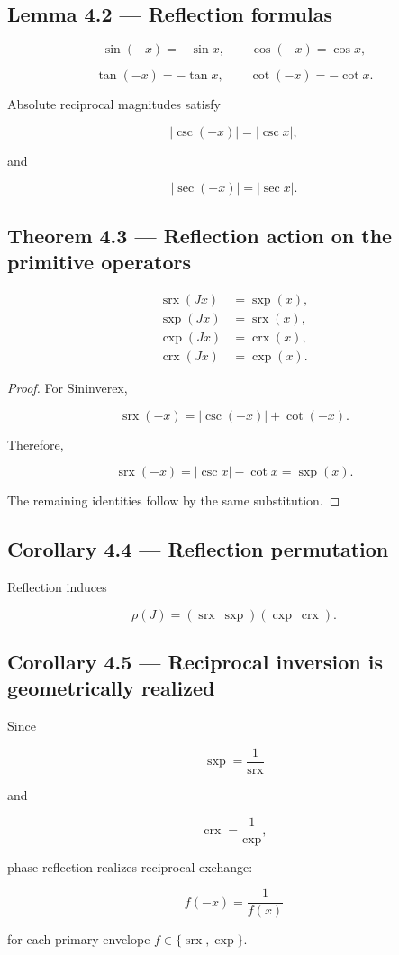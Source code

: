 \documentclass[11pt,oneside,openany]{book}
\newcommand{\PCsubsection}[1]{%
  \subsection*{#1}%
}
\begin{document}
\PCsubsection{Lemma 4.2 --- Reflection formulas}

\[
\sin(-x)=-\sin x, \qquad \cos(-x)=\cos x,
\]

\[
\tan(-x)=-\tan x, \qquad \cot(-x)=-\cot x.
\]

Absolute reciprocal magnitudes satisfy

\[
|\csc(-x)|=|\csc x|,
\]

and

\[
|\sec(-x)|=|\sec x|.
\]

\PCsubsection{Theorem 4.3 --- Reflection action on the primitive operators}

\[
\boxed{ \begin{aligned} \operatorname{srx}(Jx)&=\operatorname{sxp}(x),\\ \operatorname{sxp}(Jx)&=\operatorname{srx}(x),\\ \operatorname{cxp}(Jx)&=\operatorname{crx}(x),\\ \operatorname{crx}(Jx)&=\operatorname{cxp}(x). \end{aligned} }
\]

\begin{proof}
For Sininverex,

\[
\operatorname{srx}(-x) = |\csc(-x)|+\cot(-x).
\]

Therefore,

\[
\operatorname{srx}(-x) = |\csc x|-\cot x = \operatorname{sxp}(x).
\]

The remaining identities follow by the same substitution.

\end{proof}

\PCsubsection{Corollary 4.4 --- Reflection permutation}

Reflection induces

\[
\boxed{ \rho(J) = (\operatorname{srx}\ \operatorname{sxp}) (\operatorname{cxp}\ \operatorname{crx}) }.
\]

\PCsubsection{Corollary 4.5 --- Reciprocal inversion is geometrically realized}

Since

\[
\operatorname{sxp} = \frac1{\operatorname{srx}}
\]

and

\[
\operatorname{crx} = \frac1{\operatorname{cxp}},
\]

phase reflection realizes reciprocal exchange:

\[
\boxed{ f(-x)=\frac1{f(x)} }
\]

for each primary envelope \(f\in\{\operatorname{srx},\operatorname{cxp}\}\).
\end{document}
